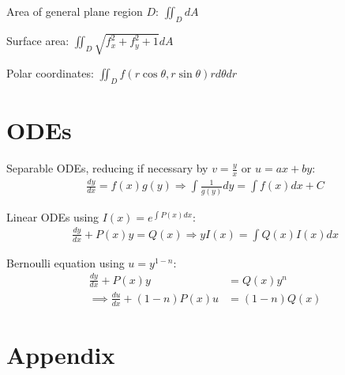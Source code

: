 \documentclass[12pt, a4paper]{article}
\begin{document}
\begin{multicols*}{3}
Area of general plane region $D$: $\displaystyle\iint_D dA$

Surface area: $\displaystyle \iint_D\sqrt{f_x^2+f_y^2+1}dA$

Polar coordinates: $\displaystyle \iint_Df(r\cos\theta,r\sin\theta)r d\theta dr$

\section{ODEs}
Separable ODEs, reducing if necessary by $\displaystyle v=\frac{y}{x}$ or $u=ax+by$:
\begin{align*}
  \frac{dy}{dx} = f(x)g(y)\Rightarrow \int \frac{1}{g(y)}dy = \int f(x) dx + C
\end{align*}

Linear ODEs using $I(x) = e^{\int P(x) dx}$:
\begin{align*}
  \frac{dy}{dx} + P(x)y = Q(x)\Rightarrow yI(x) = \int Q(x)I(x)dx
\end{align*}

Bernoulli equation using $u=y^{1-n}$:
\begin{align*}
  \frac{dy}{dx} + P(x)y &= Q(x)y^n\\
  \implies \frac{du}{dx} + (1-n)P(x)u&=(1-n)Q(x)
\end{align*}
\colbreak
\section*{Appendix}

\end{multicols*}
\end{document}
